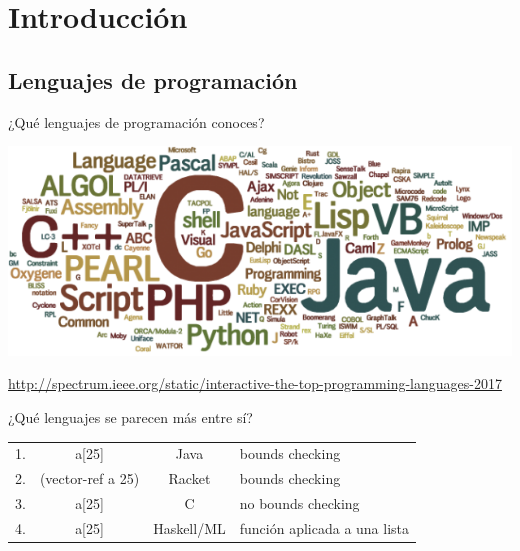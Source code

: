 \documentclass{beamer} %
\begin{document}

\section{Introducción}

\subsection{Lenguajes de programación}

\begin{frame}{¿Qué lenguajes de programación conoces?}
    \pause
    \begin{center}
    \includegraphics[width=\textwidth]{./image/cap1/languages}
    \end{center}
    \scriptsize{\url{http://spectrum.ieee.org/static/interactive-the-top-programming-languages-2017}}
\end{frame}

\begin{frame}{¿Qué lenguajes se parecen más entre sí?}
    \begin{tabular}{cccl}
      1. & \textsf{a[25]}             & Java       & bounds checking\\
      2. & \textsf{(vector-ref a 25)} & Racket     & bounds checking\\
      3. & \textsf{a[25]}             & C          & no bounds checking\\
      4. & \textsf{a[25]}             & Haskell/ML & función aplicada a una lista\\
    \end{tabular}
\end{frame}
\end{document}
